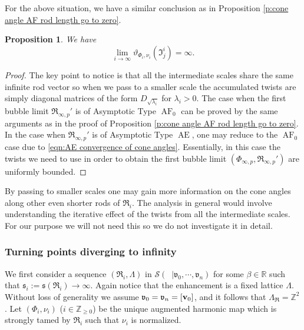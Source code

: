 \documentclass[a4paper,11pt]{amsart}
\newtheorem{proposition}[theorem]{Proposition}
\theoremstyle{definition}
\numberwithin{equation}{section}
\newcommand{\R}{\mathbb{R}}
\newcommand{\dZ}{\mathbb{Z}}
\newcommand{\mv} {\mathfrak v}
\newcommand{\ms} {\mathfrak s}
\newcommand{\mI} {\mathfrak I}
\newcommand{\mR} {\mathfrak R}
\DeclareMathOperator{\bv}{{\bf v}}
\DeclareMathOperator{\Ae}{AE}
\DeclareMathOperator{\AF}{AF}
\DeclareMathOperator{\AFa}{AF_\beta}
\begin{document}
For the above situation, we have a similar conclusion as in Proposition \ref{p:cone angle AF rod length go to zero}. 

\begin{proposition}\label{p:deep scale angle goes to infinity}
    We have  $$\lim_{i\rightarrow\infty}\vartheta_{\Phi_i, \nu_i}(\mI_j^i)=\infty.$$
\end{proposition}
\begin{proof}
     The key point to notice is that all the intermediate scales share the same infinite rod vector so when we pass to a smaller scale the accumulated twists are simply diagonal matrices of the form $D_{\sqrt{\lambda_i}}$ for $\lambda_i>0$. The case when the first bubble limit $\mR_{\infty, p}'$ is of Asymptotic Type $\AF_0$ can be proved by the same arguments as in the proof of Proposition \ref{p:cone angle AF rod length go to zero}. In the case when $\mR_{\infty, p}'$ is of Asymptotic Type $\Ae$, one may reduce to the $\AF_0$ case due to \eqref{eqn:AE convergence of cone angles}. Essentially, in this case the twists we need to use in order to obtain the first bubble limit $(\Phi_{\infty, p}, \mR_{\infty, p}')$ are uniformly bounded. 
\end{proof}



By passing to  smaller scales one may gain more information on the cone angles along other even shorter rods of $\mR_i$.  The analysis in general would involve understanding the iterative effect of the twists from all the intermediate scales. For our purpose  we will not need this so we do not investigate it in detail.

\subsubsection{Turning points diverging to infinity}\label{sss:limit of cone angles with turning points go to infinity}
We first  consider a sequence $(\mR_i, \Lambda)$  in $\mathcal S(\AFa| \mv_0, \cdots, \mv_n)$ for some $\beta\in \R$ such that $\ms_i:=\ms(\mR_i)\rightarrow\infty$. Again notice that the enhancement is a fixed lattice $\Lambda$. Without loss of generality we assume $\mv_0=\mv_n=[\bv_0]$, and it follows that $\Lambda_{\mR}=\mathbb{Z}^2$. Let $(\Phi_i, \nu_i)$ ($i\in \dZ_{\geq 0}$) be the unique augmented harmonic map which is strongly tamed by $\mR_i$ such that $\nu_i$ is normalized.
\end{document}
